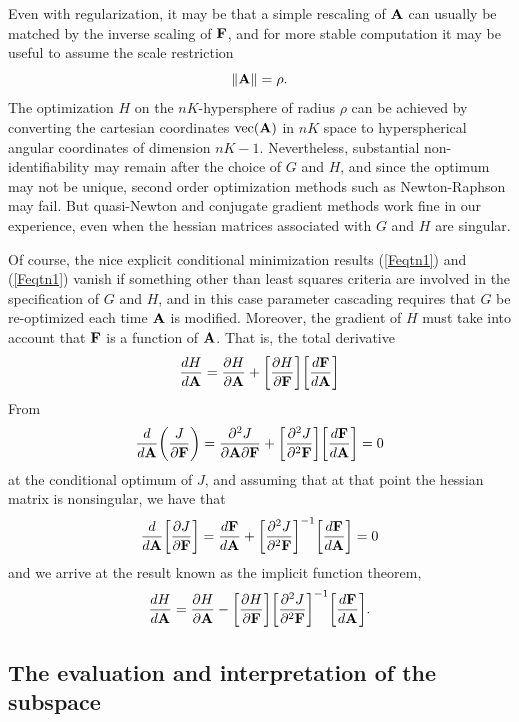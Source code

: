 \documentclass[12pt]{article}
\begin{document}
Even with regularization, it may be that a simple rescaling of $\mbox{\bf A}$ can usually be matched by the inverse scaling of $\mbox{\bf F}$, and for more stable computation it may be useful to assume the scale restriction
\begin{equation} \label{Ascale}
  \| \mbox{\bf A} \| = \rho.
\end{equation}
The optimization $H$ on the $nK$-hypersphere of radius $\rho$ can be achieved by converting the cartesian coordinates $\mbox{vec}(\mbox{\bf A})$ in $nK$ space to hyperspherical angular coordinates of dimension $nK-1$.  Nevertheless, substantial non-identifiability may remain after the choice of $G$ and $H$, and since the optimum may not be unique, second order optimization methods such as Newton-Raphson may fail.  But quasi-Newton and conjugate gradient methods work fine in our experience, even when the hessian matrices associated with $G$ and $H$ are singular.

Of course, the nice explicit conditional minimization results (\ref{Feqtn1}) and (\ref{Feqtn1}) vanish if something other than least squares criteria are involved in the specification of $G$ and $H$, and in this case parameter cascading requires that $G$ be re-optimized each time $\mbox{\bf A}$ is modified.  Moreover, the gradient of $H$ must take into account that $\mbox{\bf F}$ is a function of $\mbox{\bf A}$.  That is, the total derivative 
\[
  \frac{d H}{d \mbox{\bf A}} = \frac{\partial H}{\partial \mbox{\bf A}} + \bigg[\frac{\partial H}{\partial \mbox{\bf F}}\bigg] \bigg[\frac{d \mbox{\bf F}}{d \mbox{\bf A}}\bigg]
\]
From 
\[
  \frac{d}{d \mbox{\bf A}} \bigg(\frac{J}{\partial \mbox{\bf F}}\bigg) = 
  \frac{\partial^2 J}{\partial \mbox{\bf A} \partial \mbox{\bf F}} + \bigg[\frac{\partial^2 J}{\partial^2 \mbox{\bf F}} \bigg] \bigg[\frac{d \mbox{\bf F}}{d \mbox{\bf A}}\bigg] = 0
\] 
at the conditional optimum of $J$, and assuming that at that point the hessian matrix is nonsingular, we have that
\[
  \frac{d }{d \mbox{\bf A}} \bigg[\frac{\partial J}{\partial \mbox{\bf F} }\bigg] = \frac{d \mbox{\bf F}}{d \mbox{\bf A}} + \bigg[\frac{\partial^2 J}{\partial^2 \mbox{\bf F}} \bigg]^{-1} \bigg[\frac{d \mbox{\bf F}}{d \mbox{\bf A}}\bigg] = 0
\]
and we arrive at the result known as the implicit function theorem,
\[
  \frac{d H}{d \mbox{\bf A}} = \frac{\partial H}{\partial \mbox{\bf A}} - \bigg[\frac{\partial H}{\partial \mbox{\bf F}}\bigg] \bigg[\frac{\partial^2 J}{\partial^2 \mbox{\bf F}} \bigg]^{-1} \bigg[\frac{d \mbox{\bf F}}{d \mbox{\bf A}}\bigg].
\]


\subsection{The evaluation and interpretation of the subspace}
\label{subsec:subspace}
\end{document}
